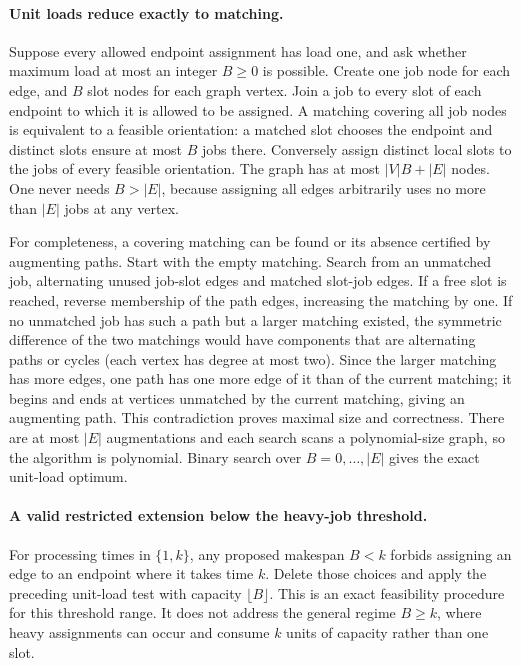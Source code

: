 \documentclass[11pt]{article}
\begin{document}
\paragraph{Unit loads reduce exactly to matching.}
Suppose every allowed endpoint assignment has load one, and ask
whether maximum load at most an integer $B\ge0$ is possible.
Create one job node for each edge, and $B$ slot nodes for
each graph vertex. Join a job to every slot of each endpoint
to which it is allowed to be assigned. A matching covering all
job nodes is equivalent to a feasible orientation: a matched slot
chooses the endpoint and distinct slots ensure at most $B$ jobs
there. Conversely assign distinct local slots to the jobs of every
feasible orientation. The graph has at most $|V|B+|E|$ nodes.
One never needs $B>|E|$, because assigning all edges arbitrarily
uses no more than $|E|$ jobs at any vertex.

For completeness, a covering matching can be found or its absence
certified by augmenting paths. Start with the empty matching. Search
from an unmatched job, alternating unused job-slot edges and matched
slot-job edges. If a free slot is reached, reverse membership of
the path edges, increasing the matching by one. If no unmatched
job has such a path but a larger matching existed, the symmetric
difference of the two matchings would have components that are
alternating paths or cycles (each vertex has degree at most two).
Since the larger matching has more edges, one path has one more
edge of it than of the current matching; it begins and ends at
vertices unmatched by the current matching, giving an augmenting
path. This contradiction proves maximal size and correctness.
There are at most $|E|$ augmentations and each search scans a
polynomial-size graph, so the algorithm is polynomial. Binary search
over $B=0,\ldots,|E|$ gives the exact unit-load optimum.

\paragraph{A valid restricted extension below the heavy-job threshold.}
For processing times in $\{1,k\}$, any proposed makespan
$B<k$ forbids assigning an edge to an endpoint where it takes
time $k$. Delete those choices and apply the preceding unit-load
test with capacity $\lfloor B\rfloor$. This is an exact
feasibility procedure for this threshold range. It does not address
the general regime $B\ge k$, where heavy assignments can occur
and consume $k$ units of capacity rather than one slot.
\end{document}
